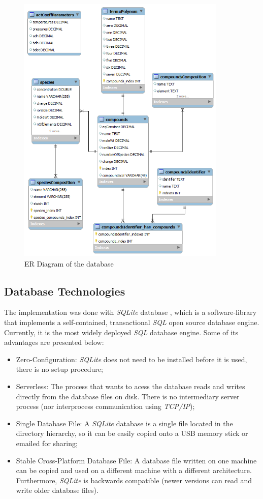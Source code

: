 \begin{figure}[ht!]
\centering
\includegraphics[width=100mm]{figures/ER_diagram.png}
\caption{ER Diagram of the database}
\label{fig:ERDiagram}
\end{figure}

\subsection{Database Technologies}
The implementation was done with \emph{SQLite} database \cite{SQLite}, which is a software-library that implements a self-contained, transactional \emph{SQL} open source database engine. Currently, it is the most widely deployed \emph{SQL} database engine. Some of its advantages are presented below:
\begin{itemize}
\item Zero-Configuration: \emph{SQLite} does not need to be installed before it is used, there is no setup procedure;
\item Serverless: The process that wants to acess the database reads and writes directly from the database files on disk. There is no intermediary server process (nor interprocess communication using \emph{TCP/IP});
\item Single Database File: A \emph{SQLite} database is a single file located in the directory hierarchy, so it can be easily copied onto a USB memory stick or emailed for sharing;
\item Stable Cross-Platform Database File: A database file written on one machine can be copied and used on a different machine with a different architecture. Furthermore, \emph{SQLite} is backwards compatible (newer versions can read and write older database files).
\end{itemize}

